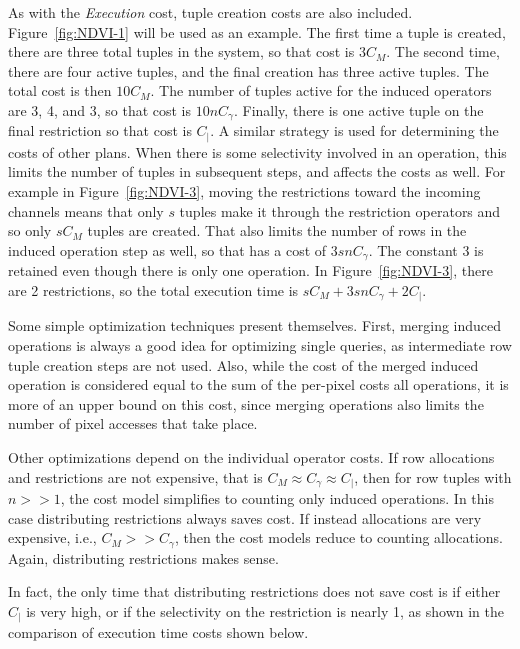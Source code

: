 \documentclass{ucdthesis}       %
\begin{document}
As with the \emph{Execution} cost, tuple creation costs are also
included.  Figure~\ref{fig:NDVI-1} will be used as an example.  The
first time a tuple is created, there are three total tuples in the
system, so that cost is $3 C_{M}$.  The second time, there are four
active tuples, and the final creation has three active tuples.  The
total cost is then $10 C_{M}$.  The number of tuples active for the
induced operators are 3, 4, and 3, so that cost is $10 n C_{\gamma}$.
Finally, there is one active tuple on the final restriction so that
cost is $C_{|}$.  A similar strategy is used for determining the costs
of other plans.  When there is some selectivity involved in an
operation, this limits the number of tuples in subsequent steps, and
affects the costs as well.  For example in Figure~\ref{fig:NDVI-3},
moving the restrictions toward the incoming channels means that only
$s$ tuples make it through the restriction operators and so only $s
C_{M}$ tuples are created.  That also limits the number of rows in the
induced operation step as well, so that has a cost of $3 s n
C_{\gamma}$.  The constant 3 is retained even though there is only one
operation.  In Figure~\ref{fig:NDVI-3}, there are 2 restrictions, so
the total execution time is $s C_{M} + 3 s n C_{\gamma} + 2 C_{|}$.

Some simple optimization techniques present themselves.  First,
merging induced operations is always a good idea for optimizing single
queries, as intermediate row tuple creation steps are not used.  Also,
while the cost of the merged induced operation is considered
equal to the sum of the per-pixel costs all operations, it is more of an
upper bound on this cost, since merging operations also limits the
number of pixel accesses that take place.

Other optimizations depend on the individual operator costs.  If row
allocations and restrictions are not expensive, that is $C_{M} \approx
C_{\gamma} \approx C_{|}$, then for row tuples with $n>>1$, the cost
model simplifies to counting only induced operations.  In this case
distributing restrictions always saves cost.  If instead allocations
are very expensive, i.e., $C_{M} >> C_{\gamma}$, then the cost models reduce
to counting allocations.  Again, distributing restrictions makes
sense.

In fact, the only time that distributing restrictions does not save cost
is if either $C_{|}$ is very high, or if the selectivity on the
restriction is nearly 1, as shown in the comparison of execution time
costs shown below.
\end{document}
